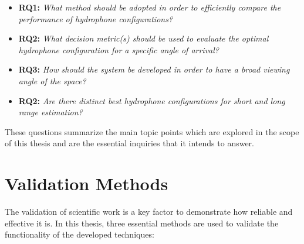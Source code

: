 \begin{itemize}

	\item \textbf{RQ1: }\textit{What method should be adopted in order to efficiently compare the performance of hydrophone configurations?}
	
	\item \textbf{RQ2: }\textit{What decision metric(s) should be used to evaluate the optimal hydrophone configuration for a specific angle of arrival?}
	
	\item \textbf{RQ3: }\textit{How should the system be developed in order to have a broad viewing angle of the space?}
	
	\item \textbf{RQ2: }\textit{Are there distinct best hydrophone configurations for short and long range estimation?}
	
\end{itemize}

These questions summarize the main topic points which are explored in the scope of this thesis and are the essential inquiries that it intends to answer.

\section{Validation Methods} \label{sec:validation}

The validation of scientific work is a key factor to demonstrate how reliable and effective it is. In this thesis, three essential methods are used to validate the functionality of the developed techniques:

